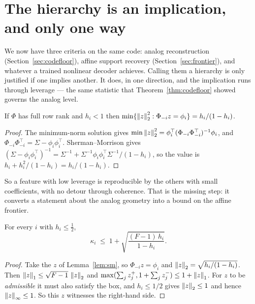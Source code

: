 \section{The hierarchy is an implication, and only one way}
\label{sec:hierarchy}

We now have three criteria on the same code: analog reconstruction
(Section~\ref{sec:codefloor}), affine support recovery (Section~\ref{sec:frontier}), and whatever
a trained nonlinear decoder achieves. Calling them a hierarchy is only justified if one implies
another. It does, in one direction, and the implication runs through leverage --- the same
statistic that Theorem~\ref{thm:codefloor} showed governs the analog level.

\begin{lemma}
\label{lem:sm}
If $\Phi$ has full row rank and $h_i<1$ then
$\min\{\left\lVert z \right\rVert_2^2:\Phi_{-i}z=\phi_i\}=h_i/(1-h_i)$.
\end{lemma}

\begin{proof}
The minimum-norm solution gives
$\min\left\lVert z \right\rVert_2^2=\phi_i^{\top}(\Phi_{-i}\Phi_{-i}^{\top})^{-1}\phi_i$, and
$\Phi_{-i}\Phi_{-i}^{\top}=\Sigma-\phi_i\phi_i^{\top}$. Sherman--Morrison gives
$(\Sigma-\phi_i\phi_i^{\top})^{-1}=\Sigma^{-1}+\Sigma^{-1}\phi_i\phi_i^{\top}\Sigma^{-1}/(1-h_i)$,
so the value is $h_i+h_i^2/(1-h_i)=h_i/(1-h_i)$.
\end{proof}

So a feature with low leverage is reproducible by the others with small coefficients, with no
detour through coherence. That is the missing step: it converts a statement about the analog
geometry into a bound on the affine frontier.

\begin{theorem}
\label{thm:arrow}
For every $i$ with $h_i\le\tfrac12$,
\begin{equation}
  \kappa_i\;\le\;1+\sqrt{\frac{(F-1)\,h_i}{1-h_i}} .
  \label{eq:arrow}
\end{equation}
\end{theorem}

\begin{proof}
Take the $z$ of Lemma~\ref{lem:sm}, so $\Phi_{-i}z=\phi_i$ and
$\left\lVert z \right\rVert_2=\sqrt{h_i/(1-h_i)}$. Then $\left\lVert z \right\rVert_1\le\sqrt{F-1}\,\left\lVert z \right\rVert_2$ and
$\max(\sum_jz^{+}_j,1+\sum_jz^{-}_j)\le1+\left\lVert z \right\rVert_1$. For $z$ to be \emph{admissible} it must also
satisfy the box, and $h_i\le1/2$ gives $\left\lVert z \right\rVert_2\le1$ and hence $\left\lVert z \right\rVert_\infty\le1$. So this
$z$ witnesses the right-hand side.
\end{proof}

